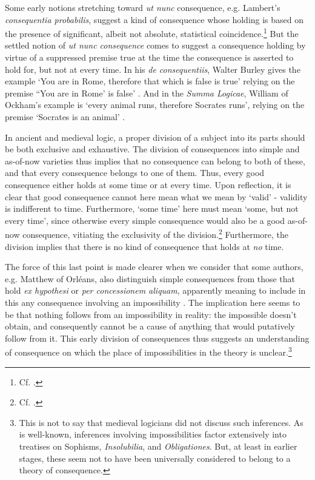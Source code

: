 \documentclass[]{article}
\begin{document}
Some early notions stretching toward \textit{ut nunc} consequence, e.g. Lambert's \textit{consequentia probabilis}, suggest a kind of consequence whose holding is based on the presence of significant, albeit not absolute, statistical coincidence.\footnote{Cf. \autocite[q. 35, 196.48-80]{FavershamQE}.} But the settled notion of \textit{ut nunc consequence} comes to suggest a consequence holding by virtue of a suppressed premise true at the time the consequence is asserted to hold for, but not at every time. In his \textit{de consequentiis}, Walter Burley gives the example `You are in Rome, therefore that which is false is true' relying on the premise ``You are in Rome' is false' \autocite[V. par. 69, p. 128]{Green-Pedersen1980b}. And in the \textit{Summa Logicae}, William of Ockham's example is `every animal runs, therefore Socrates runs', relying on the premise `Socrates is an animal' \autocite[III-3, c. 1, pp. 587.11-588.18]{OckhamSL}.

In ancient and medieval logic, a proper division of a subject into its parts should be both exclusive and exhaustive. The division of consequences into simple and as-of-now varieties thus implies that no consequence can belong to both of these, and that every consequence belongs to one of them. Thus, every good consequence either holds at some time or at every time. Upon reflection, it is clear that good consequence cannot here mean what we mean by `valid' - validity is indifferent to time. Furthermore, `some time' here must mean `some, but not every time', since otherwise every simple consequence would also be a good as-of-now consequence, vitiating the exclusivity of the division.\footnote{Cf. \autocite[141.11-15]{RichardAbstractiones}.} Furthermore, the division implies that there is no kind of consequence that holds at \textit{no} time. 

The force of this last point is made clearer when we consider that some authors, e.g. Matthew of Orl\'{e}ans, also distinguish simple consequences from those that hold \textit{ex hypothesi} or \textit{per concessionem aliquam}, apparently meaning to include in this any consequence involving an impossibility \autocite[IV, 141-142, pp. 339-340]{MatthewSophistaria}. The implication here seems to be that nothing follows from an impossibility in reality: the impossible doesn't obtain, and consequently cannot be a cause of anything that would putatively follow from it. This early division of consequences thus suggests an understanding of consequence on which the place of impossibilities in the theory is unclear.\footnote{This is not to say that medieval logicians did not discuss such inferences. As is well-known, inferences involving impossibilities factor extensively into treatises on Sophisms, \textit{Insolubilia}, and \textit{Obligationes}. But, at least in earlier stages, these seem not to have been universally considered to belong to a theory of consequence.}
\end{document}
